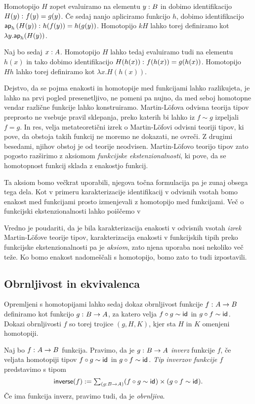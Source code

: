 \begin{dokaz}
  Homotopijo \(H\) zopet evaluiramo na elementu \({y : B}\) in dobimo
  identifikacijo \(H(y) \,\colon f(y) = g(y)\). Če sedaj nanjo apliciramo funkcijo \(h\),
  dobimo identifikacijo \(\textnormal{\textsf{ap}}_{h}\,(H(y)) \,\colon h(f(y)) = h(g(y))\). Homotopijo \(kH\) lahko
  torej definiramo kot
  \(\lambda y. \textnormal{\textsf{ap}}_{h}(H(y))\).

  Naj bo sedaj \({x : A}\). Homotopijo \(H\) lahko tedaj evaluiramo tudi
  na elementu \(h(x)\) in tako dobimo identifikacijo
  \(H(h(x)) \,\colon f(h(x)) = g(h(x))\). Homotopijo \(Hh\) lahko torej definiramo kot
  \(\lambda x.H(h(x))\).
\end{dokaz}

Dejstvo, da se pojma enakosti in homotopije med funkcijami lahko razlikujeta, je lahko na prvi pogled presenetljivo, ne pomeni pa nujno, da med seboj homotopne vendar različne funkcije lahko konstruiramo. Martin-Löfova odvisna teorija tipov preprosto ne vsebuje pravil sklepanja, preko katerih bi lahko iz \(f \sim g\) izpeljali \(f = g\). In res, velja metateoretični izrek o Martin-Löfovi odvisni teoriji tipov, ki pove, da obstoja takih funkcij ne moremo ne dokazati, ne ovreči. Z drugimi besedami, njihov obstoj je od teorije neodvisen. Martin-Löfovo teorijo tipov zato pogosto razširimo z aksiomom \emph{funkcijske ekstenzionalnosti}, ki pove, da se homotopnost funkcij sklada z enakostjo funkcij.

Ta aksiom bomo večkrat uporabili, njegova točna formulacija pa je zunaj obsega tega dela. Kot v primeru karakterizacije identifikacij v odvisnih vsotah bomo enakost med funkcijami prosto izmenjevali z homotopijo med funkcijami. Več o funkcijski ekstenzionalnosti lahko poiščemo v \cite[Poglavje II.13]{rijke2022introduction}

Vredno je poudariti, da je bila karakterizacija enakosti v odvisnih vsotah \emph{izrek} Martin-Löfove teorije tipov, karakterizacija enakosti v funkcijskih tipih preko funkcijske ekstenzionalnosti pa je \emph{aksiom}, zato njena uporaba nosi nekoliko več teže. Ko bomo enakost nadomeščali s homotopijo, bomo zato to tudi izpostavili.

\subsection{Obrnljivost in ekvivalenca}
Opremljeni s homotopijami lahko sedaj dokaz obrnljivost funkcije \(f \,\colon A \to B\) definiramo kot funkcijo \(g \,\colon B \to A\), za katero velja \(f \circ g \sim \textnormal{\textsf{id}}_{}\) in
\(g \circ f \sim \textnormal{\textsf{id}}_{}\). Dokazi obrnljivosti \(f\) so torej trojice \((g, H, K)\), kjer sta \(H\) in \(K\) omenjeni homotopiji.
\begin{definicija}
  Naj bo \(f \,\colon A \to B\) funkcija. Pravimo, da je \(g \,\colon B \to A\) \emph{inverz} funkcije \(f\), če veljata homotopiji tipov \(f \circ g \sim \textnormal{\textsf{id}}_{}\) in \(g \circ f \sim \textnormal{\textsf{id}}_{}\).
  \emph{Tip inverzov funkcije \(f\)} predstavimo s tipom
  \[\textnormal{\textsf{inverse}}(f) := \textstyle \sum_{\left( {g : B \to A} \right)} (f \circ g \sim \textnormal{\textsf{id}}_{}) \times (g \circ f \sim \textnormal{\textsf{id}}_{}).\]
  Če ima funkcija inverz, pravimo tudi, da je \emph{obrnljiva}.
\end{definicija}

